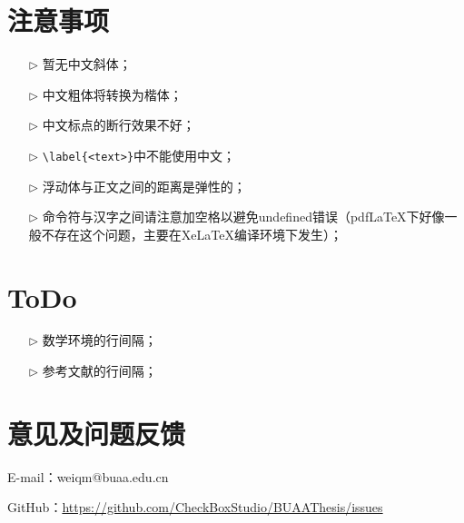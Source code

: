 \section{注意事项}
\begin{itemize}
  \item[$\triangleright$] 暂无中文斜体；
  \item[$\triangleright$] 中文粗体将转换为楷体；
  \item[$\triangleright$] 中文标点的断行效果不好；
  \item[$\triangleright$] \verb|\label{<text>}|中不能使用中文；
  \item[$\triangleright$] 浮动体与正文之间的距离是弹性的；
  \item[$\triangleright$] 命令符与汉字之间请注意加空格以避免undefined错误（pdfLaTeX下好像一般不存在这个问题，主要在XeLaTeX编译环境下发生）；
\end{itemize}

\section{ToDo}
\begin{itemize}
  \item[$\triangleright$] 数学环境的行间隔；
  \item[$\triangleright$] 参考文献的行间隔；
\end{itemize}

\section{意见及问题反馈}

\indent E-mail：weiqm@buaa.edu.cn

\indent GitHub：\href{https://github.com/CheckBoxStudio/BUAAThesis/issues}{https://github.com/CheckBoxStudio/BUAAThesis/issues}
